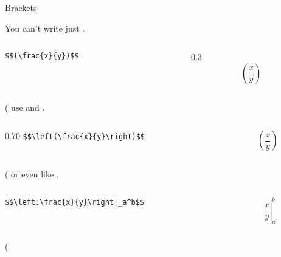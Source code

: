 \begin{frame}[fragile]{Brackets\preMagicPage}\relax

You can't write just
\vphantom. 
    \begin{columns}
        \begin{column}{0.70\textwidth}
          \hfill \lstinline[basicstyle=\tt\normalsize]"$$(\frac{x}{y})$$" 
        \end{column}
        \begin{column}{0.3\textwidth}
             $$(\frac{x}{y})$$
        \end{column}
    \end{columns}
    \vphantom(
    \incPause
use \ccol{\left} and \ccol{\right}
     \vphantom. 
    \begin{columns}
        \begin{column}{0.70\textwidth}
          \hfill \lstinline[basicstyle=\tt\normalsize]"$$\left(\frac{x}{y}\right)$$" 
        \end{column}
        \begin{column}{0.3\textwidth}
             $$\left(\frac{x}{y}\right)$$
        \end{column}
    \end{columns}
    \vphantom(
    \incPause
or even like 
\vphantom. 
    \begin{columns}
        \begin{column}{0.70\textwidth}
          \hfill \lstinline[basicstyle=\tt\normalsize]"$$\left.\frac{x}{y}\right|_a^b$$" 
        \end{column}
        \begin{column}{0.3\textwidth}
             $$\left.\frac{x}{y}\right|_a^b$$
        \end{column}
    \end{columns}
    \vphantom(
\end{frame}

